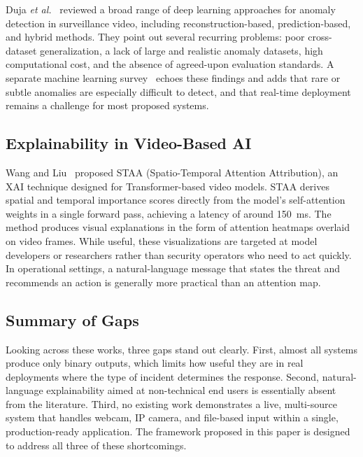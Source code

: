 \documentclass[conference]{IEEEtran}
\begin{document}
Duja \textit{et al.}~\cite{duja2024} reviewed a broad range of deep
learning approaches for anomaly detection in surveillance video,
including reconstruction-based, prediction-based, and hybrid methods.
They point out several recurring problems: poor cross-dataset
generalization, a lack of large and realistic anomaly datasets,
high computational cost, and the absence of agreed-upon evaluation
standards. A separate machine learning survey~\cite{survey2023} echoes
these findings and adds that rare or subtle anomalies are especially
difficult to detect, and that real-time deployment remains a challenge
for most proposed systems.

\subsection{Explainability in Video-Based AI}

Wang and Liu~\cite{wang2025} proposed STAA (Spatio-Temporal Attention
Attribution), an XAI technique designed for Transformer-based video
models. STAA derives spatial and temporal importance scores directly
from the model's self-attention weights in a single forward pass,
achieving a latency of around 150~ms. The method produces visual
explanations in the form of attention heatmaps overlaid on video frames.
While useful, these visualizations are targeted at model developers or
researchers rather than security operators who need to act quickly.
In operational settings, a natural-language message that states the
threat and recommends an action is generally more practical than an
attention map.

\subsection{Summary of Gaps}

Looking across these works, three gaps stand out clearly.
First, almost all systems produce only binary outputs, which limits
how useful they are in real deployments where the type of incident
determines the response.
Second, natural-language explainability aimed at non-technical
end users is essentially absent from the literature.
Third, no existing work demonstrates a live, multi-source system that
handles webcam, IP camera, and file-based input within a single,
production-ready application.
The framework proposed in this paper is designed to address all three
of these shortcomings.

\end{document}
